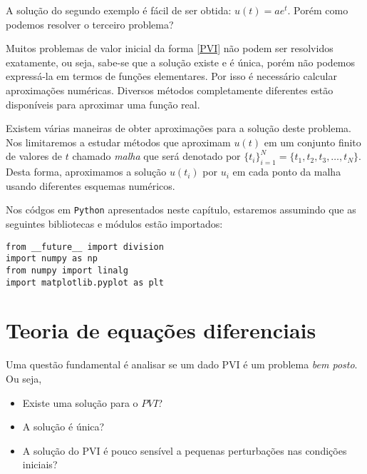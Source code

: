 A solução do segundo exemplo é fácil de ser obtida: $u(t)=ae^t$. Porém como podemos resolver o terceiro problema?


%


Muitos problemas de valor inicial da forma \eqref{PVI} não podem ser resolvidos exatamente, ou seja, sabe-se que a solução existe e é única, porém não podemos expressá-la em termos de funções elementares. Por isso é necessário calcular aproximações numéricas. Diversos métodos completamente diferentes estão disponíveis para aproximar uma função real.

Existem várias maneiras de obter aproximações para a solução deste problema. Nos limitaremos a estudar métodos que aproximam $u(t)$ em um conjunto finito de valores de $t$ chamado \emph{malha} que será denotado por  $\{t_i\}_{i=1}^N=\{t_1, t_2, t_3,\ldots, t_N\}$. Desta forma, aproximamos a solução $u(t_i)$ por $u_i$ em cada ponto da malha usando diferentes esquemas numéricos.

\ifispython
Nos códgos em \verb+Python+ apresentados neste capítulo, estaremos assumindo que as seguintes bibliotecas e módulos estão importados:
\begin{verbatim}
from __future__ import division
import numpy as np
from numpy import linalg
import matplotlib.pyplot as plt
\end{verbatim}
\fi

\section{Teoria de equações diferenciais}
Uma questão fundamental é analisar se um dado PVI é um problema \emph{bem posto}. Ou seja,
\begin{itemize}
 \item Existe uma solução para o $PVI$?
 \item A solução é única?
 \item A solução do PVI é pouco sensível a pequenas perturbações nas condições iniciais?
\end{itemize}


